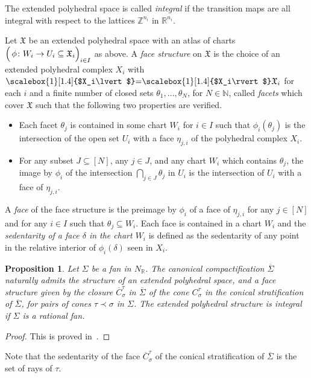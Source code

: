 \documentclass[11pt]{amsart}
\newtheorem{prop}[thm]{Proposition}
\theoremstyle{definition}
\numberwithin{equation}{section}
\renewcommand{\~}{\widetilde}
\newcommand{\Z}{\mathbb{Z}}
\newcommand{\R}{\mathbb{R}}
\newcommand{\comp}[1]{\overline{#1}} %
\newcommand{\X}{\mathfrak X}
\newcommand{\suppaux}[2]{\scalebox{1}[1.4]{$#1\lvert$}#2\scalebox{1}[1.4]{$#1\rvert$}}
\newcommand{\supp}[1]{\mathpalette\suppaux{#1}}
\newcommand{\subface}{\prec}
\begin{document}
The extended polyhedral space is called \emph{integral} if the transition maps are all integral with respect to the lattices $\Z^{n_i}$ in $\R^{n_i}$.

\medskip

Let $\X$ be an extended polyhedral space with an atlas of charts $\Bigl(\,\phi \colon  W_i \to U_i  \subseteq \X_i\Bigr)_{i\in I}$ as above. A \emph{face structure} on $\X$ is the choice of an extended polyhedral complex $X_i$ with $\supp{X_i} = \X_i$ for each $i$ and a finite number of closed sets $\theta_1, \dots, \theta_N$, for $N \in \mathbb N$, called \emph{facets} which cover $\X$ such that the following two properties are verified.

\begin{itemize}
\item Each facet $\theta_j$ is contained in some chart $W_i$ for $i\in I$ such that $\phi_i(\theta_j)$ is the intersection of the open set $U_i$ with a face $\eta_{j, i}$ of the polyhedral complex $X_i$.
\item For any subset $J \subseteq [N]$, any $j \in J$, and any chart $W_i$ which contains $\theta_j$, the image by $\phi_i$ of the intersection $\bigcap_{j\in J} \theta_j$ in $U_i$ is the intersection of $U_i$ with a face of $\eta_{j,i}$.
\end{itemize}
A \emph{face} of the face structure is the preimage by $\phi_i$ of a face of $\eta_{j,i}$ for any $j\in[N]$ and for any $i\in  I$ such that $\theta_j\subseteq W_i$. Each face is contained in a chart $W_i$  and the \emph{sedentarity of a face $\delta$ in the chart $W_i$} is defined as the sedentarity of any point in the relative interior of $\phi_i(\delta)$ seen in $X_i$.

\begin{prop} Let $\Sigma$ be a fan in $N_\R$. The canonical compactification $\comp \Sigma$ naturally admits the structure of an extended polyhedral space, and a face structure given by the closure $\comp C^\tau_\sigma$ in $\comp \Sigma$ of the cone $C^\tau_\sigma$ in the conical stratification of $\comp \Sigma$, for pairs of cones $\tau \subface \sigma$ in $\Sigma$. The extended polyhedral structure is integral if $\Sigma$ is a rational fan.
\end{prop}
\begin{proof} This is proved in~\cite{AP-geom}.
\end{proof}

Note that the sedentarity of the face $\comp C^\tau_\sigma$ of the conical stratification of $\comp \Sigma$ is the set of rays of $\tau$.
\end{document}
